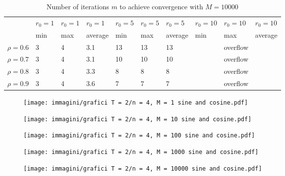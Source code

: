 \documentclass[a4paper,11pt,openright]{report}
\begin{document}
\begin{table}[H]
\centering
\addtolength{\leftskip}{-1.5cm}
\addtolength{\rightskip}{-1.5cm}
\begin{tabular}{|c|lllllllll|}
\hline
$ $ & $r_0 = 1$ & $r_0 = 1$ & $r_0 = 1$ & $r_0 = 5$ & $r_0 = 5$ & $r_0 = 5$ & $r_0 = 10$ & $r_0 = 10$ & $r_0 = 10$  \\
$ $ & min & max & average & min & max & average & min & max & average \\ 
\hline
$\rho = 0.6$ & 3 & 4 & 3.1 & 13 & 13 & 13 &  & overflow &  \\

$\rho = 0.7$ & 3 & 4 & 3.1 & 10 & 10 & 10 &  & overflow &  \\

$\rho = 0.8$ & 3 & 4 & 3.3 & 8 & 8 & 8 &  & overflow & \\

$\rho = 0.9$ & 3 & 4 & 3.6 & 7 & 7 & 7 &  & overflow & \\
\hline
\end{tabular}
\caption{Number of iterations $m$ to achieve convergence with $M = 10000$}
\end{table}
\begin{figure}[H]
\centering
\texttt{[image: immagini/grafici T = 2/n = 4, M = 1 sine and cosine.pdf]}
\end{figure}
\begin{figure}[H]
\centering
\texttt{[image: immagini/grafici T = 2/n = 4, M = 10 sine and cosine.pdf]}
\end{figure}
\begin{figure}[H]
\centering
\texttt{[image: immagini/grafici T = 2/n = 4, M = 100 sine and cosine.pdf]}
\end{figure}
\begin{figure}[H]
\centering
\texttt{[image: immagini/grafici T = 2/n = 4, M = 1000 sine and cosine.pdf]}
\end{figure}
\begin{figure}[H]
\centering
\texttt{[image: immagini/grafici T = 2/n = 4, M = 10000 sine and cosine.pdf]}
\end{figure}
\newpage
\end{document}
